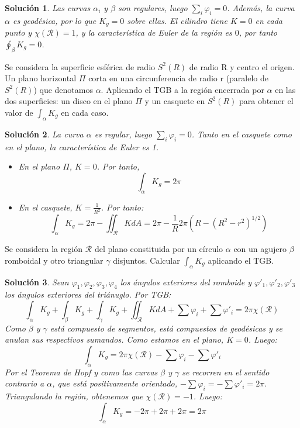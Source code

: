 \documentclass[twoside]{report}
\theoremstyle{plain}
\newtheorem*{sol*}{Solución}
\newcommand{\X}{\chi}
\newenvironment{ejercicio}[2][Estado]{\begin{trivlist}
\item[\hskip \labelsep {\bfseries Ejercicio}\hskip \labelsep {\bfseries #2.}]}{\end{trivlist}}
\begin{document}
\begin{sol*}
Las curvas $\alpha_i$ y $\beta$ son regulares, luego $\sum_i \varphi_i =0$. Además, la curva $\alpha$ es geodésica, por lo que $K_g=0$ sobre ellas. El cilindro tiene $K=0$ en cada punto y $\chi(\mathcal{R})=1$, y la característica de Euler de la región es $0$, por tanto $\oint_\beta K_g = 0$.
\end{sol*}
\newpage
\begin{ejercicio}{14} Se considera la superficie esférica de radio $S^2(R)$ de radio R y centro el origen. Un plano horizontal $\Pi$ corta en una circunferencia de radio r (paralelo de $S^2(R)$) que denotamos $\alpha$. Aplicando el TGB a la región encerrada por $\alpha$ en las dos superficies: un disco en el plano $\Pi$ y un casquete en $S^2(R)$ para obtener el valor de $\int_\alpha K_g$ en cada caso.
\end{ejercicio}
\begin{sol*}
La curva $\alpha$ es regular, luego $\sum_i \varphi_i =0$. Tanto en el casquete como en el plano, la característica de Euler es 1. 
\begin{itemize}
\item En el plano $\Pi$, $K=0$. Por tanto, 
\[
\int_\alpha K_g = 2\pi
\]
\item En el casquete, $K=\frac{1}{R^2}$. Por tanto:
\[
\int_\alpha K_g = 2\pi - \iint_{\mathcal{R}}K dA = 2\pi - \frac{1}{R} 2\pi(R - (R^2-r^2)^{1/2})
\]
\end{itemize}
\end{sol*}
\newpage
\begin{ejercicio}{20}
Se considera la región $\mathcal{R}$ del plano constituida por un círculo $\alpha$ con un agujero $\beta$ romboidal y otro triangular $\gamma$ disjuntos. Calcular $\int_\alpha K_g$ aplicando el TGB.
\end{ejercicio}
\begin{sol*} Sean $\varphi_1,\varphi_2,\varphi_3,\varphi_4$ los ángulos exteriores del romboide y  $\varphi'_1,\varphi'_2,\varphi'_3$ los ángulos exteriores del triánuglo. Por TGB:
\[ \int_\alpha K_g + \int_\beta K_g + \int_\gamma K_g + \iint_\mathcal{R} K dA + \sum \varphi_i + \sum \varphi'_i = 2 \pi \X(\mathcal{R}) \]
Como $\beta$ y $\gamma$ está compuesto de segmentos, está compuestos de geodésicas y se anulan sus respectivos sumandos. Como estamos en el plano, $K = 0$. Luego:
\[ \int_\alpha K_g = 2 \pi \X(\mathcal{R}) - \sum \varphi_i - \sum \varphi'_i \]
Por el Teorema de Hopf y como las curvas $\beta$ y $\gamma$ se recorren en el sentido contrario a $\alpha$, que está positivamente orientado, $-\sum \varphi_i = -\sum \varphi'_i = 2\pi$. Triangulando la región, obtenemos que $\X(\mathcal{R})=-1$. Luego:
\[ \int_\alpha K_g = -2\pi+2\pi+2\pi = 2\pi \]
\end{sol*}
\end{document}
